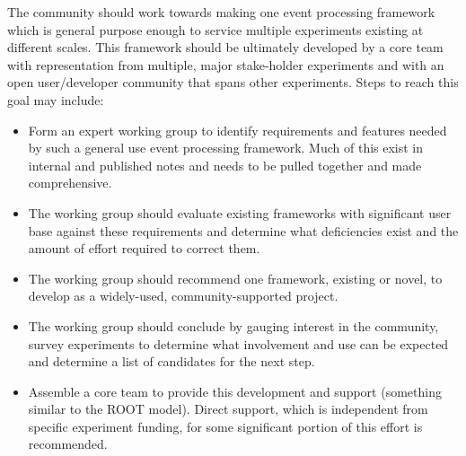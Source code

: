\noindent The community should work towards making one event
processing framework which is general purpose enough to service
multiple experiments existing at different scales.  This framework
should be ultimately developed by a core team with representation from
multiple, major stake-holder experiments and with an open
user/developer community that spans other experiments.  Steps to reach
this goal may include:

\begin{itemize}
\item Form an expert working group to identify requirements and
  features needed by such a general use event processing framework.
  Much of this exist in internal and published notes and needs to be
  pulled together and made comprehensive.
\item The working group should evaluate existing frameworks with
  significant user base against these requirements and determine what
  deficiencies exist and the amount of effort required to correct
  them.
\item The working group should recommend one framework, existing or
  novel, to develop as a widely-used, community-supported project.
\item The working group should conclude by gauging interest in the
  community, survey experiments to determine what involvement and use
  can be expected and determine a list of candidates for the next
  step.
\item Assemble a core team to provide this development and support
  (something similar to the ROOT model).  Direct support, which is
  independent from specific experiment funding, for some significant
  portion of this effort is recommended.
\end{itemize}

